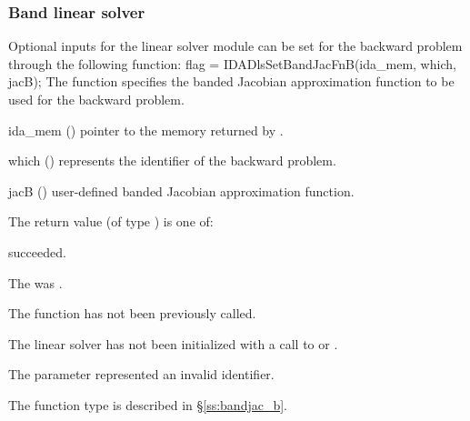 \subsubsection{Band linear solver}
Optional inputs for the {\idaband} linear solver module can be set for the backward
problem through the following function:
{
  flag = IDADlsSetBandJacFnB(ida\_mem, which, jacB);
}
{
  The function  specifies the banded Jacobian
  approximation function to be used for the backward problem.
}
{
  \begin{args}
  \item[ida\_mem] ()
    pointer to the {\idas} memory returned by .
  \item[which] ()
    represents the identifier of the backward problem.
  \item[jacB] ()
    user-defined banded Jacobian approximation function.
  \end{args}
}
{
  The return value  (of type ) is one of:
  \begin{args}
  \item[\Id{IDADLS\_SUCCESS}] 
     succeeded.
  \item[\Id{IDADLS\_MEM\_NULL}]
    The  was .
  \item[\Id{IDADLS\_NO\_ADJ}]
    The function  has not been previously called.
  \item[\Id{IDADLS\_LMEM\_NULL}]
    The linear solver has not been initialized with a call to  or
    .
  \item[\Id{IDADLS\_ILL\_INPUT}]
    The parameter  represented an invalid identifier.
  \end{args}
}
{
  The function type  is described in \S\ref{ss:bandjac_b}.
}

